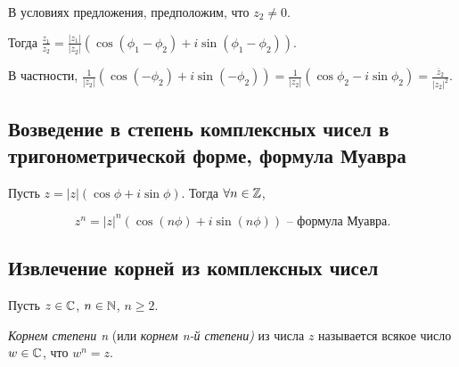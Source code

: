 \begin{corollary}
    В условиях предложения, предположим, что $z_2 \neq 0$.

    Тогда $\frac{z_1}{z_2} = \frac{|z_1|}{|z_2|} (\cos (\phi_1 - \phi_2) + i \sin(\phi_1 - \phi_2))$.

    В частности, $\frac{1}{|z_2|}(\cos(- \phi_2) + i\sin(- \phi_2)) = \frac{1}{|z_2|}(\cos \phi_2 - i \sin \phi_2) = \frac{\overline{z}_2}{|z_2|^2}$.
\end{corollary}

\subsection{Возведение в степень комплексных чисел в тригонометрической форме, формула Муавра}

\begin{corollary}
    Пусть $z = |z|(\cos \phi + i \sin \phi)$. Тогда $\forall n \in \mathbb{Z}$,

    \begin{equation*}
        z^n = |z|^n (\cos(n \phi) + i \sin(n \phi)) \text{ -- формула Муавра}
    .\end{equation*}

\end{corollary}

\begin{comment}
    В комплексном анализе функция $\exp: \RR \to \RR$, $x \to e^x$, доопределяется до функции $\exp: \CC \to \CC$, $z \to e^z$ с сохранением всех привычных свойств.

    Доказывается $e^{i \phi} = \cos \phi + i \sin \phi$, $\forall \phi \in \CC$ -- формула Эйлера.

    Тогда $\forall z \in \CC$ представляется в виде $z = |z| e^{i \phi}$, где $\phi \in Arg(z)$ -- \textit{показательная форма}.
\end{comment}

\subsection{Извлечение корней из комплексных чисел}

Пусть $z \in \mathbb{C}$, $n \in \mathbb{N}$, $n \geq 2$.

\begin{definition}
    \textit{Корнем степени n} (или \textit{корнем n-й степени)} из числа $z$ называется всякое число $w \in \mathbb{C}$, что $w^n = z$.
\end{definition}

